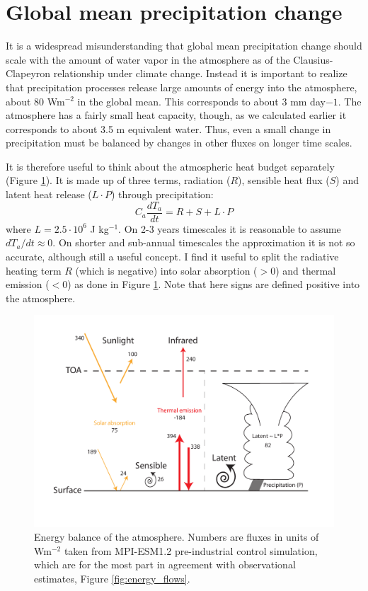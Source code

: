 \documentclass[12pt]{book}
\begin{document}
\section{Global mean precipitation change}
It is a widespread misunderstanding that global mean precipitation change should scale with the amount of water vapor in the atmosphere as of the Clausius-Clapeyron relationship under climate change. Instead it is important to realize that  precipitation processes release large amounts of energy into the atmosphere, about 80 Wm$^{-2}$ in the global mean. This corresponds to about 3 mm day${-1}$. The atmosphere has a fairly small heat capacity, though, as we calculated earlier it corresponds to about 3.5 m equivalent water. Thus, even a small change in precipitation must be balanced by changes in other fluxes on longer time scales. 

It is therefore useful to think about the atmospheric heat budget separately (Figure \ref{fig:energy_hydrological_cycles}). It is made up of three terms, radiation ($R$), sensible heat flux ($S$) and latent heat release ($L\cdot P$) through precipitation:
\begin{equation}
C_a\frac{dT_a}{dt} = R + S + L\cdot P
\label{eq:atmospheric_heat_budget}
\end{equation}
where $L=2.5\cdot 10^6$ J kg$^{-1}$. On 2-3 years timescales it is reasonable to assume $dT_a/dt\approx 0$. On shorter and sub-annual timescales the approximation it is not so accurate, although still a useful concept. I find it useful to split the radiative heating term $R$ (which is negative) into solar absorption ($>0$) and thermal emission ($<0$) as done in Figure \ref{fig:energy_hydrological_cycles}. Note that here signs are defined positive into the atmosphere.

\begin{figure}
\begin{center}
\includegraphics[width=14 cm]{../Illustrations/Energy_hydrological_cycles.pdf}
\end{center}
\caption{ Energy balance of the atmosphere. Numbers are fluxes in units of Wm$^{-2}$ taken from MPI-ESM1.2 pre-industrial control simulation, which are for the most part in agreement with observational estimates, Figure \ref{fig:energy_flows}. } 
\label{fig:energy_hydrological_cycles}
\end{figure}
\end{document}
